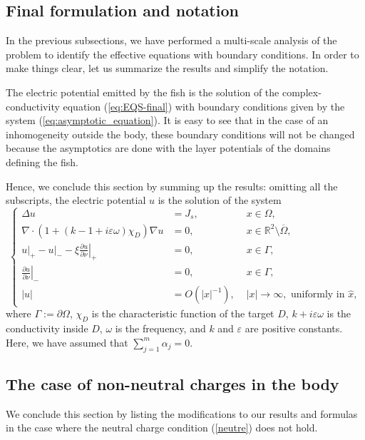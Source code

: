 \subsection{Final formulation and notation}

In the previous subsections, we have performed a multi-scale
analysis of the problem to identify the effective equations with
boundary conditions. In order to make things clear, let us
summarize the results and simplify the notation.

The electric potential emitted by the fish is the solution of the
complex-conductivity equation (\ref{eq:EQS-final}) with boundary
conditions given by the system (\ref{eq:asymptotic_equation}). It
is easy to see that in the case of an inhomogeneity outside the
body, these boundary conditions will not be changed because the
asymptotics are done with the layer potentials of the domains
defining the fish.

Hence, we conclude this section by summing up the results:
omitting all the subscripts, the electric potential $u$ is the
solution of the system
\begin{equation}
\left\{ \begin{alignedat}{2}\Delta u & = {J_s}, & \,
\, x\in \Omega,\\
\nabla\cdot (1+ (k -1 +i\varepsilon\omega) \chi_D) \nabla u & = 0,
& \,
\, x\in\mathbb{R}^{2}\setminus\overline{\Omega},\\
{} u \big|_+ - u \big|_- -\xi\left.\frac{\partial u}{\partial\nu}\right|_{+} & =0, & \,\, x\in\Gamma,\\
\left.\frac{\partial u}{\partial\nu}\right|_{-} & =0, & \,\, x\in\Gamma,\\
\left|u\right| & = {O}(\left|x\right|^{-1}), &
\,\,\left|x\right|\rightarrow\infty,\text{ uniformly in }\hat{x},
\end{alignedat}
\right.\label{eq:direct_problem-final}
\end{equation}
where $\Gamma:= \partial \Omega$,  $\chi_D$ is the characteristic
function of the target $D$, $k+ i \varepsilon \omega$ is the
conductivity inside $D$, $\omega$ is the frequency, and $k$ and
$\varepsilon$ are positive constants. Here, we have assumed that
$\sum_{j=1}^m \alpha_j=0$.
\subsection{The case of non-neutral charges in the body}

We conclude this section by listing the modifications to our
results and formulas in the case where the neutral charge
condition (\ref{neutre}) does not hold.

